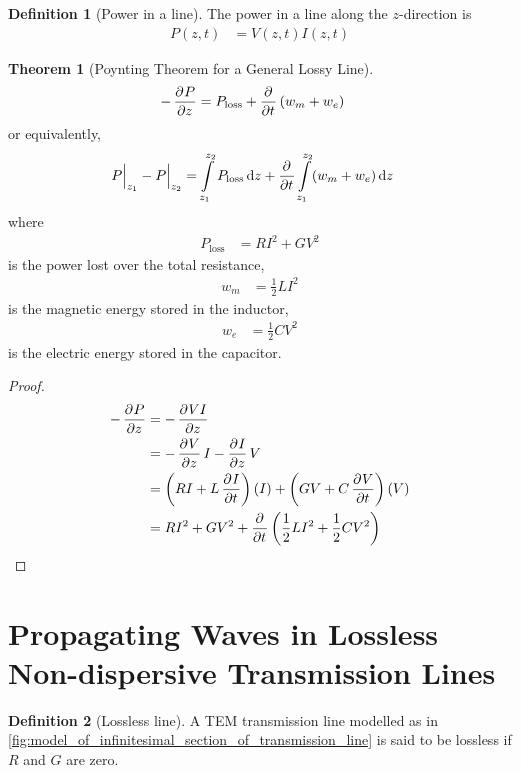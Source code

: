 \documentclass[titlepage, fleqn, a4paper, 12pt, twoside]{article}
\theoremstyle{definition}
\newtheorem{definition}{Definition}
\theoremstyle{theorem}
\newtheorem{theorem}{Theorem}
\begin{document}
\begin{definition}[Power in a line]
	The power in a line along the $z$-direction is
	\begin{align*}
		P(z,t) &= V(z,t) I(z,t)
	\end{align*}
\end{definition}

\begin{theorem}[Poynting Theorem for a General Lossy Line]
	\begin{align*}
		-\dpd{P}{z} &= P_{\text{loss}} + \dpd{}{t}(w_m + w_e)
	\end{align*}
	or equivalently,
	\begin{align*}
		P \Big|_{z_1} - P \Big|_{z_2} &= \int\limits_{z_1}^{z_2} P_{\text{loss}} \dif z + \dpd{}{t} \int\limits_{z_1}^{z_2} (w_m + w_e) \dif z
	\end{align*}
	where
	\begin{align*}
		P_{\text{loss}} &= R I^2 + G V^2
	\end{align*}
	is the power lost over the total resistance,
	\begin{align*}
		w_m &= \frac{1}{2} L I^2
	\end{align*}
	is the magnetic energy stored in the inductor,
	\begin{align*}
		w_e &= \frac{1}{2} C V^2
	\end{align*}
	is the electric energy stored in the capacitor.
	\label{thm:Poynting_theorem_for_a_general_lossy_line}
\end{theorem}

\begin{proof}
	\begin{align*}
		-\dpd{P}{z} &= -\dpd{V I}{z}\\
		&= -\dpd{V}{z} I - \dpd{I}{z} V\\
		&= \left( R I + L \dpd{I}{t} \right) (I) + \left( G V + C \dpd{V}{t} \right) (V)\\
		&= R I^2 + G V^2 + \dpd{}{t}\left( \frac{1}{2} L I^2 + \frac{1}{2} C V^2 \right)
	\end{align*}
\end{proof}

\section{Propagating Waves in Lossless Non-dispersive Transmission Lines}

\begin{definition}[Lossless line]
	A TEM transmission line modelled as in \cref{fig:model_of_infinitesimal_section_of_transmission_line} is said to be lossless if $R$ and $G$ are zero.
\end{definition}
\end{document}
